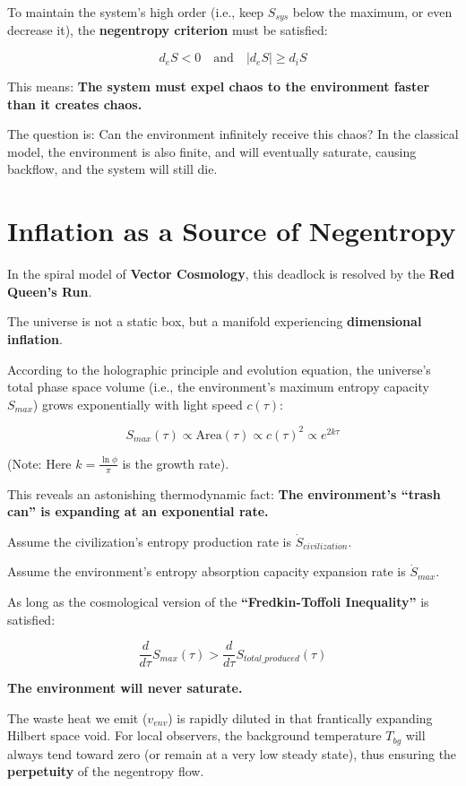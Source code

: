 To maintain the system's high order (i.e., keep $S_{sys}$ below the maximum, or even decrease it), the \textbf{negentropy criterion} must be satisfied:

\[d_e S < 0 \quad \text{and} \quad |d_e S| \ge d_i S\]

This means: \textbf{The system must expel chaos to the environment faster than it creates chaos.}

The question is: Can the environment infinitely receive this chaos? In the classical model, the environment is also finite, and will eventually saturate, causing backflow, and the system will still die.

\section{Inflation as a Source of Negentropy}

In the spiral model of \textbf{Vector Cosmology}, this deadlock is resolved by the \textbf{Red Queen's Run}.

The universe is not a static box, but a manifold experiencing \textbf{dimensional inflation}.

According to the holographic principle and evolution equation, the universe's total phase space volume (i.e., the environment's maximum entropy capacity $S_{max}$) grows exponentially with light speed $c(\tau)$:

\[S_{max}(\tau) \propto \text{Area}(\tau) \propto c(\tau)^2 \propto e^{2k\tau}\]

(Note: Here $k = \frac{\ln \phi}{\pi}$ is the growth rate).

This reveals an astonishing thermodynamic fact: \textbf{The environment's ``trash can'' is expanding at an exponential rate.}

Assume the civilization's entropy production rate is $\dot{S}_{civilization}$.

Assume the environment's entropy absorption capacity expansion rate is $\dot{S}_{max}$.

As long as the cosmological version of the \textbf{``Fredkin-Toffoli Inequality''} is satisfied:

\[\frac{d}{d\tau} S_{max}(\tau) > \frac{d}{d\tau} S_{total\_produced}(\tau)\]

\textbf{The environment will never saturate.}

The waste heat we emit ($v_{env}$) is rapidly diluted in that frantically expanding Hilbert space void. For local observers, the background temperature $T_{bg}$ will always tend toward zero (or remain at a very low steady state), thus ensuring the \textbf{perpetuity} of the negentropy flow.


